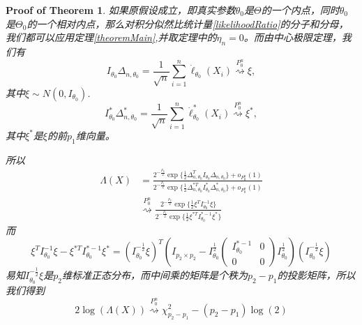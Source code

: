 \documentclass[review]{elsarticle}
\newtheorem{proofOfTheorem}{Proof of Theorem}
\begin{document}
\begin{proofOfTheorem}
    如果原假设成立，即真实参数$\theta_0$是$\Theta$的一个内点，同时$\theta_0$是$\Theta_0$的一个相对内点，那么对积分似然比统计量\eqref{likelihoodRatio}的分子和分母，我们都可以应用定理\ref{theoremMain},并取定理中的$\eta_n=0$。而由中心极限定理，我们有
\begin{equation}
    I_{\theta_0}\Delta_{n,\theta_0}=\frac{1}{\sqrt{n}}\sum^n_{i=1}\dot{\ell}_{\theta_0}(X_i)\overset{P_0^n}{\rightsquigarrow }\xi, 
\end{equation}
其中$\xi\sim N(0,I_{\theta_0})$.
\begin{equation}
    I^*_{\theta_0}\Delta^*_{n,\theta_0}=\frac{1}{\sqrt{n}}\sum^n_{i=1}\dot{\ell}^*_{\theta_0}(X_i)\overset{P_0^n}{\rightsquigarrow} \xi^*, 
\end{equation}
其中$\xi^*$是$\xi$的前$p_1$维向量。

所以
\begin{equation}\label{equationNull}
    \begin{aligned} 
        \Lambda(X)&=
        \frac{
            2^{-\frac{p_2}{2}}\exp\{\frac{1}{2}\Delta_{n,\theta_0}^TI_{\theta_0}\Delta_{n,\theta_0}\}+o_{P_0^n}(1)
        }{
            2^{-\frac{p_1}{2}}\exp\{\frac{1}{2}\Delta_{n,\theta_0}^{*T}I^*_{\theta_0}\Delta^*_{n,\theta_0}\}+o_{P_0^n}(1)
        }
        \\
        &\overset{P_{0}^n}{\rightsquigarrow }
        \frac{
            2^{-\frac{p_2}{2}}\exp\{\frac{1}{2}\xi^TI^{-1}_{\theta_0}\xi\}
        }{
            2^{-\frac{p_1}{2}}\exp\{\frac{1}{2}\xi^{*T}I^{*-1}_{\theta_0}\xi^*\}
        }
    \end{aligned}
\end{equation}
而
\begin{equation}\label{equationXi}
    \xi^TI^{-1}_{\theta_0}\xi -\xi^{*T}I^{*-1}_{\theta_0}\xi^*
    =(I_{\theta_0}^{-\frac{1}{2}}\xi)^T(
        I_{p_{2}\times p_{2}}-
        I_{\theta_0}^{\frac{1}{2}}
        \left(\begin{matrix} 
                I^{*-1}_{\theta_0}&0\\
                0&0
        \end{matrix}\right)
        I_{\theta_0}^{\frac{1}{2}}
    )(I_{\theta_0}^{-\frac{1}{2}}\xi)
\end{equation}
易知$I_{\theta_0}^{-\frac{1}{2}}\xi$是$p_2$维标准正态分布，而中间乘的矩阵是个秩为$p_2-p_1$的投影矩阵，所以我们得到
\begin{equation}
    2\log(\Lambda(X))\overset{P_0^n}{\rightsquigarrow} \chi^2_{p_2-p_1}-(p_2-p_1)\log(2)
\end{equation}
\end{proofOfTheorem}
\end{document}

